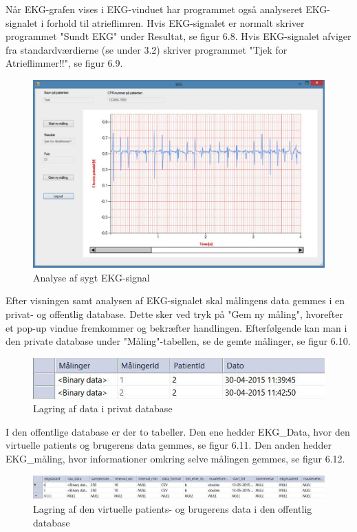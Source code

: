Når EKG-grafen vises i EKG-vinduet har programmet også analyseret EKG-signalet i forhold til atrieflimren. Hvis EKG-signalet er normalt skriver programmet "Sundt EKG" under Resultat, se figur 6.8. Hvis EKG-signalet afviger fra standardværdierne (se under 3.2) skriver programmet "Tjek for Atrieflimmer!!", se figur 6.9. 

\begin{figure}[H]
	\centering
	\includegraphics[width=1\textwidth]{Figurer/Snip20150525_26}
	\caption{Analyse af sygt EKG-signal}
\end{figure}

Efter visningen samt analysen af EKG-signalet skal målingens data gemmes i en privat- og offentlig database. Dette sker ved tryk på "Gem ny måling", hvorefter et pop-up vindue fremkommer og bekræfter handlingen. Efterfølgende kan man i den private database under "Måling"\--tabellen, se de gemte målinger, se figur 6.10.   

\begin{figure}[H]
	\centering
	\includegraphics[width=1\textwidth]{Figurer/Snip20150525_27}	
	\caption{Lagring af data i privat database}
\end{figure}

I den offentlige database er der to tabeller. Den ene hedder EKG\_Data, hvor den virtuelle patients og brugerens data gemmes, se figur 6.11. Den anden hedder EKG\_måling, hvor informationer omkring selve målingen gemmes, se figur 6.12. 

\begin{figure}[H]
	\centering
	\includegraphics[width=1\textwidth]{Figurer/Snip20150525_28}
	\caption{Lagring af den virtuelle patients- og brugerens data i den offentlig database}
\end{figure}

